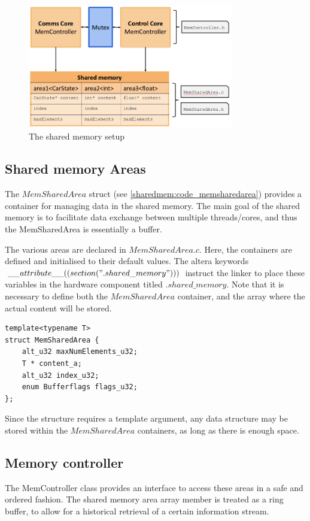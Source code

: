 \begin{figure}[h]\label{sharedmem:pic_overview}
  \caption{The shared memory setup}
  \centering
    \includegraphics[width=0.8\textwidth]{figures/shared_memory.png}
\end{figure}

\subsection{Shared memory Areas}
The $MemSharedArea$ struct (see \ref{sharedmem:code_memsharedarea}) provides a container for managing data in the shared memory. The main goal of the shared memory is to facilitate data exchange between multiple threads/cores, and thus the MemSharedArea is essentially a buffer. 

The various areas are declared in $MemSharedArea.c$. Here, the containers are defined and initialised to their default values. The altera keywords $\_\_attribute\_\_ ((section (".shared\_memory")))$ instruct the linker to place these variables in the hardware component titled $.shared\_memory$. Note that it is necessary to define both the $MemSharedArea$ container, and the array where the actual content will be stored.

\begin{lstlisting}[label=sharedmem:code_memsharedarea caption={The $MemSharedArea$ structure, $software/shared\_files/MemSharedArea.h$}]
template<typename T>
struct MemSharedArea {
	alt_u32 maxNumElements_u32;
	T * content_a;
	alt_u32 index_u32;
	enum Bufferflags flags_u32;
};
\end{lstlisting}


Since the structure requires a template argument, any data structure may be stored within the $MemSharedArea$ containers, as long as there is enough space.

\subsection{Memory controller}
The MemController class provides an interface to access these areas in a safe and ordered fashion. The shared memory area array member is treated as a ring buffer, to allow for a historical retrieval of a certain information stream. 

